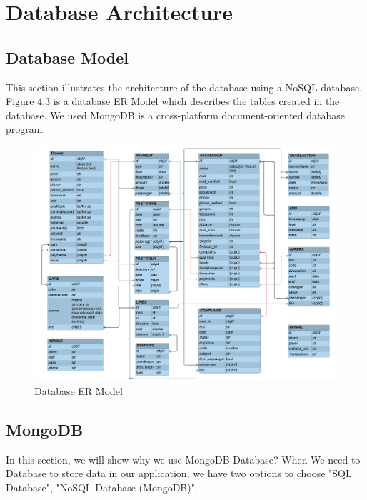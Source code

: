 \section{Database Architecture}

\subsection{Database Model}


This section illustrates the architecture of the database using a NoSQL database.
Figure 4.3 is a database ER Model which describes the tables created in the database.
We used MongoDB is a cross-platform document-oriented database program.
\newline
\begin{figure}[htp]%
    \center%
    \includegraphics[width=1.1\textwidth]{images/ch4/db_model.png}%
    \caption[Database ER Model]{Database ER Model}\label{fig: Database ER Model}%
  \end{figure}
\newline

\newpage

\subsection{MongoDB}
\hspace{2cm}In this section, we will show why we use MongoDB Database?
 When We need to Database to store data in our application, we have two options to choose "SQL Database", "NoSQL Database (MongoDB)".

